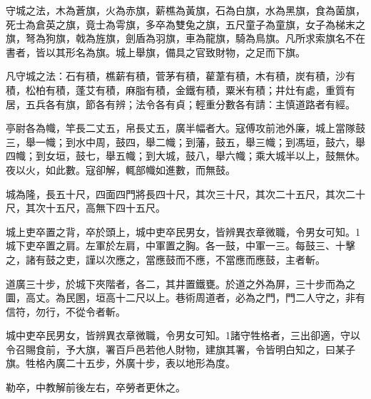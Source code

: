 
\begin{pinyinscope}
守城之法，木為蒼旗，火為赤旗，薪樵為黃旗，石為白旗，水為黑旗，食為菌旗，死士為倉英之旗，竟士為雩旗，多卒為雙兔之旗，五尺童子為童旗，女子為梯末之旗，弩為狗旗，戟為旌旗，劍盾為羽旗，車為龍旗，騎為鳥旗。凡所求索旗名不在書者，皆以其形名為旗。城上舉旗，備具之官致財物，之足而下旗。

凡守城之法：石有積，樵薪有積，菅茅有積，雚葦有積，木有積，炭有積，沙有積，松柏有積，蓬艾有積，麻脂有積，金鐵有積，粟米有積；井灶有處，重質有居，五兵各有旗，節各有辨；法令各有貞；輕重分數各有請：主慎道路者有經。

亭尉各為幟，竿長二丈五，帛長丈五，廣半幅者大。寇傅攻前池外廉，城上當隊鼓三，舉一幟；到水中周，鼓四，舉二幟；到藩，鼓五，舉三幟；到馮垣，鼓六，舉四幟；到女垣，鼓七，舉五幟；到大城，鼓八，舉六幟；乘大城半以上，鼓無休。夜以火，如此數。寇卻解，輒部幟如進數，而無鼓。

城為隆，長五十尺，四面四門將長四十尺，其次三十尺，其次二十五尺，其次二十尺，其次十五尺，高無下四十五尺。

城上吏卒置之背，卒於頭上，城中吏卒民男女，皆辨異衣章微職，令男女可知。1城下吏卒置之肩。左軍於左肩，中軍置之胸。各一鼓，中軍一三。每鼓三、十擊之，諸有鼓之吏，謹以次應之，當應鼓而不應，不當應而應鼓，主者斬。

道廣三十步，於城下夾階者，各二，其井置鐵甕。於道之外為屏，三十步而為之圜，高丈。為民圂，垣高十二尺以上。巷術周道者，必為之門，門二人守之，非有信符，勿行，不從令者斬。

城中吏卒民男女，皆辨異衣章微職，令男女可知。1諸守牲格者，三出卻適，守以令召賜食前，予大旗，署百戶邑若他人財物，建旗其署，令皆明白知之，曰某子旗。牲格內廣二十五步，外廣十步，表以地形為度。

勒卒，中教解前後左右，卒勞者更休之。


\end{pinyinscope}